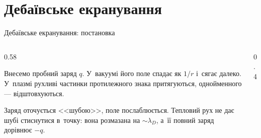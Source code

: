 \documentclass[]{beamer}
\newcommand{\fig}[2][\linewidth]{\resizebox{#1}{!}{}}
\begin{document}
\section{Дебаївське екранування}

\begin{frame}{Дебаївське екранування: постановка}
	\begin{columns}[T]
		\begin{column}{0.58\linewidth}
			\begin{block}{}\justifying\small
				Внесемо пробний заряд $q$. У~вакуумі його поле спадає як $1/r$ і~сягає далеко. У~плазмі рухливі
				частинки протилежного знака притягуються, однойменного --- відштовхуються.
			\end{block}
			\begin{block}{}\justifying\small
				Заряд оточується <<шубою>>, поле послаблюється. Тепловий рух не дає шубі стиснутися в~точку:
				вона розмазана на $\sim\lambda_D$, а~її повний заряд дорівнює $-q$.
			\end{block}
		\end{column}
		\begin{column}{0.4\linewidth}
			\fig{debye_sphere.tikz}
		\end{column}
	\end{columns}
\end{frame}
\end{document}
